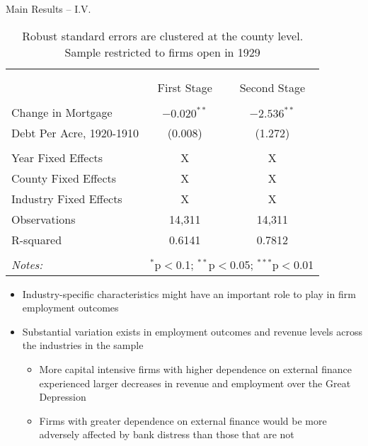 \documentclass[11pt]{beamer}
\begin{document}
\begin{frame}{Main Results -- I.V.}
\begin{table}  \tiny{
\begin{tabular}{lcc} 
\\[-1.8ex]\hline
\hline \\[-1.8ex] 
\\[-1.8ex]  & \multicolumn{1}{c}{First Stage} & \multicolumn{1}{c}{Second Stage}\\                                     
\hline \\[-1.8ex]                                                                                   
Change in Mortgage  & $-0.020^{**}$ &  $-2.536^{**}$\\                                                                          
Debt Per Acre, 1920-1910 & (0.008) &  (1.272) \\ 
\hline \\[-1.8ex]
Year Fixed Effects & \multicolumn{1}{c}{X} & \multicolumn{1}{c}{X} \\ 
County Fixed Effects  & \multicolumn{1}{c}{X} & \multicolumn{1}{c}{X} \\ 
Industry Fixed Effects &  \multicolumn{1}{c}{X} & \multicolumn{1}{c}{X} \\
Observations &  \multicolumn{1}{c}{14,311} &  \multicolumn{1}{c}{14,311} \\
R-squared  &   \multicolumn{1}{c}{0.6141} & \multicolumn{1}{c}{0.7812} \\                                                                                                                     
\hline 
\hline \\[-1.8ex] 
\textit{Notes:}  & \multicolumn{2}{r}{$^{*}$p$<$0.1; $^{**}$p$<$0.05; $^{***}$p$<$0.01} \\ 
\end{tabular}
}
\caption{\tiny{Robust standard errors are clustered at the county level. Sample restricted to firms open in 1929}}
\end{table}
\end{frame}

\begin{frame}{}
\begin{itemize}
\item Industry-specific characteristics might have an important role to play in firm employment outcomes
\item Substantial variation exists in employment outcomes and revenue levels across the industries in the sample
\begin{itemize}
\item More capital intensive firms with higher dependence on external finance experienced larger decreases in revenue and employment over the Great Depression
\item Firms with greater dependence on external finance would be more adversely affected by bank distress than those that are not
\end{itemize}
\end{itemize}

\end{frame}
\end{document}
